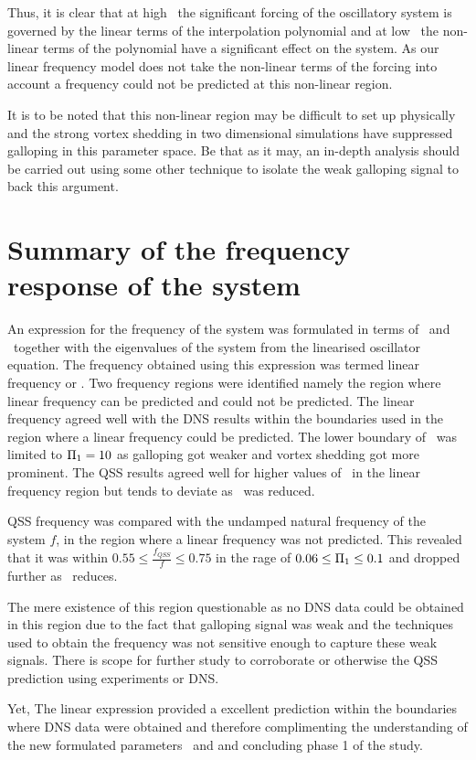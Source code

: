 Thus, it is clear that at high \massstiff\ the significant forcing of the oscillatory system is governed by the linear terms of the interpolation polynomial and at low \massstiff\ the non-linear terms of the polynomial have a significant effect on the system. As our linear frequency model does not take the non-linear terms of the forcing into account a frequency could not be predicted at this non-linear region.  	

It is to be noted that this non-linear region may be difficult to set up physically and the strong vortex shedding in two dimensional simulations have suppressed galloping in this parameter space. Be that as it may, an in-depth analysis should be carried out using some other technique to isolate the weak galloping signal to back this argument. 

\section{Summary of the frequency response of the system}

An expression for the frequency of the system was formulated in terms of \massstiff\ and \massdamp\ together with the eigenvalues of the system from the linearised oscillator equation. The frequency obtained using this expression was termed linear frequency or \freqlin. Two frequency regions were identified namely the region where linear frequency can be predicted and could not be predicted. The linear frequency agreed well with the DNS results within the boundaries used in the region where a linear frequency could be predicted. The lower boundary of \massstiff\ was limited to $\Pi_1=10$ as galloping got weaker and vortex shedding got more prominent. The QSS results agreed well for higher values of \massstiff\ in the linear frequency region but tends to deviate as \massstiff\ was reduced. 

QSS frequency was compared with the undamped natural frequency of the system $f$, in the region where a linear frequency was not predicted. This revealed that it was within $0.55\leq\frac{f_{QSS}}{f}\leq0.75$ in the rage of $0.06\leq\Pi_1\leq0.1$ and dropped further as \massstiff\ reduces.  

The mere existence of this region questionable as no DNS data could be obtained in this region due to the fact that galloping signal was weak and the techniques used to obtain the  frequency was not sensitive enough to capture these weak signals. There is scope for further study to corroborate or otherwise the QSS prediction using experiments or DNS. 

Yet, The linear expression provided a excellent prediction within the boundaries where DNS data were obtained and therefore complimenting the understanding of the new formulated parameters \massstiff\ and \massdamp and concluding phase 1 of the study.

   



